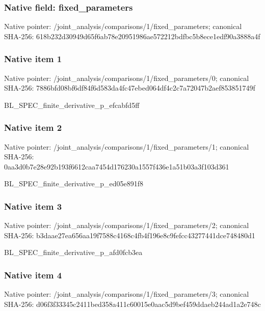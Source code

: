 \documentclass[10pt,a4paper]{article}
\begin{document}
\subsubsection{Native field: fixed\_\allowbreak{}parameters}
Native pointer: /joint\_\allowbreak{}analysis/comparisons/1/fixed\_\allowbreak{}parameters; canonical SHA-256: 618b232d30949d65f6ab78e20951986ae572212bdfbc5b8ece1edf90a3888a4f

\subsubsection{Native item 1}
Native pointer: /joint\_\allowbreak{}analysis/comparisons/1/fixed\_\allowbreak{}parameters/0; canonical SHA-256: 7886bfd08bf6df84f6d583da4fc47ebed064df4c2c7a72047b2aef853851749f

\begingroup\raggedright\sloppy BL\_\allowbreak{}SPEC\_\allowbreak{}finite\_\allowbreak{}derivative\_\allowbreak{}p\_\allowbreak{}efcabfd5ff\par\endgroup

\subsubsection{Native item 2}
Native pointer: /joint\_\allowbreak{}analysis/comparisons/1/fixed\_\allowbreak{}parameters/1; canonical SHA-256: 0aa3d0b7e28e92b193f6612caa7454d176230a1557f436e1a51b03a3f103d361

\begingroup\raggedright\sloppy BL\_\allowbreak{}SPEC\_\allowbreak{}finite\_\allowbreak{}derivative\_\allowbreak{}p\_\allowbreak{}ed05e891f8\par\endgroup

\subsubsection{Native item 3}
Native pointer: /joint\_\allowbreak{}analysis/comparisons/1/fixed\_\allowbreak{}parameters/2; canonical SHA-256: b3daae27ea656aa19f7588c4168c4fb4f196e8c9fefcc43277441dce748480d1

\begingroup\raggedright\sloppy BL\_\allowbreak{}SPEC\_\allowbreak{}finite\_\allowbreak{}derivative\_\allowbreak{}p\_\allowbreak{}afd0fcb3ea\par\endgroup

\subsubsection{Native item 4}
Native pointer: /joint\_\allowbreak{}analysis/comparisons/1/fixed\_\allowbreak{}parameters/3; canonical SHA-256: d06f3f33345c2411bed358a411c60015e0aac5d9bef459ddaeb244ad1a2e748c
\end{document}
